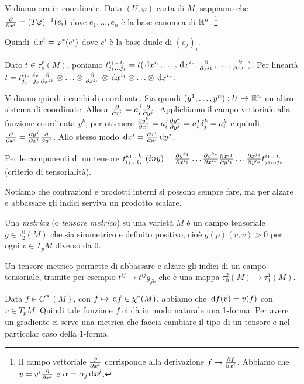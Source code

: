 Vediamo ora in coordinate. Data $(U,\varphi)$ carta di $M$, sappiamo che $\frac{\partial }{\partial x^i} = (T\varphi)^{-1}(e_i)$ dove $e_1,\ldots, e_n$ è la base canonica di $\mathbb R^n$.
\footnote{Il campo vettoriale $\frac{\partial }{\partial x^i}$ corrisponde alla derivazione $f \mapsto \frac{\partial f}{\partial x^i}$. Abbiamo che $v = v^i\frac{\partial }{\partial x^i}$ e $\alpha = \alpha_j \,\mathrm d x^j$.}

Quindi $\,\mathrm d x^i = \varphi^*(e^i)$ dove $e^i$ è la base duale di $(e_j)_i$.

Dato $t\in \tau_s^r(M)$, poniamo $t_{j_1\ldots j_s}^{i_1 \ldots i_r} = t(\,\mathrm d x^{i_1}, \ldots, \,\mathrm d x^{i_r}, \frac{\partial }{\partial x^{j_1}}, \ldots, \frac{\partial }{\partial x^{j_r}})$.
Per linearià $t = t_{j_1\ldots j_s}^{i_1 \ldots i_r} \frac{\partial }{\partial x^{j_1}} \otimes \ldots \otimes \frac{\partial }{\partial x^{j_r}} \otimes \,\mathrm d x^{i_1}\otimes \ldots \otimes \,\mathrm d x^{i_r}$.

Vediamo quindi i cambi di coordinate.
Sia quindi $(y^1,\ldots, y^n): U \to \mathbb R^n$ un altro sistema di coordinate. Allora $\frac{\partial }{\partial x^i} = a_i^j \frac{\partial }{\partial y^j}$. Applichiamo il campo vettoriale alla funzione coordinata $y^k$, per ottenere $\frac{\partial y^k}{\partial x^i} = a_i^j \frac{\partial y^k}{\partial y^j} = a_i^j \delta_j^k = a_i^k$ e quindi $\frac{\partial }{\partial x^i} = \frac{\partial y^j}{\partial x^i} \frac{\partial }{\partial y^j}$.
Allo stesso modo $\,\mathrm d x^i = \frac{\partial x^i}{\partial y^j} \,\mathrm d y^j$.

Per le componenti di un tensore $t_{l_1\ldots l_s}^{k_1\ldots k_r} (in y) = \frac{\partial y^{k_1}}{\partial x^{i_1}} \ldots \frac{\partial y^{k_r}}{\partial x^{i_r}} \frac{\partial x^{j_1}}{\partial y^{l_1}}\ldots \frac{\partial x^{j_s}}{\partial y^{l_s}} t_{j_1\ldots j_s}^{i_1\ldots i_r}$ (criterio di tensorialità). %

Notiamo che contrazioni e prodotti interni si possono sempre fare, ma per alzare e abbassare gli indici serviva un prodotto scalare.

\begin{definition}
	Una \emph{metrica} (o \emph{tensore metrico}) su una varietà $M$ è un campo tensoriale $g \in \tau_2^0(M)$ che sia simmetrico e definito positivo, cioè $g(p)(v,v)>0$ per ogni $v\in T_pM$ diverso da 0.
\end{definition}

Un tensore metrico permette di abbassare e alzare gli indici di un campo tensoriale, tramite per esempio $t^{ij} \mapsto t^{ij}g_{jk}$ che è una mappa $\tau_0^2(M) \to \tau_1^1(M)$.

Data $f\in C^\infty(M)$, con $f \mapsto \,\mathrm d f \in \chi^*(M)$, abbiamo che $\,\mathrm d f(v) = v(f)$ con $v \in T_pM$. Quindi tale funzione $f$ ci dà in modo naturale una 1-forma.
Per avere un gradiente ci serve una metrica che faccia cambiare il tipo di un tensore e nel particolar caso della 1-forma.

